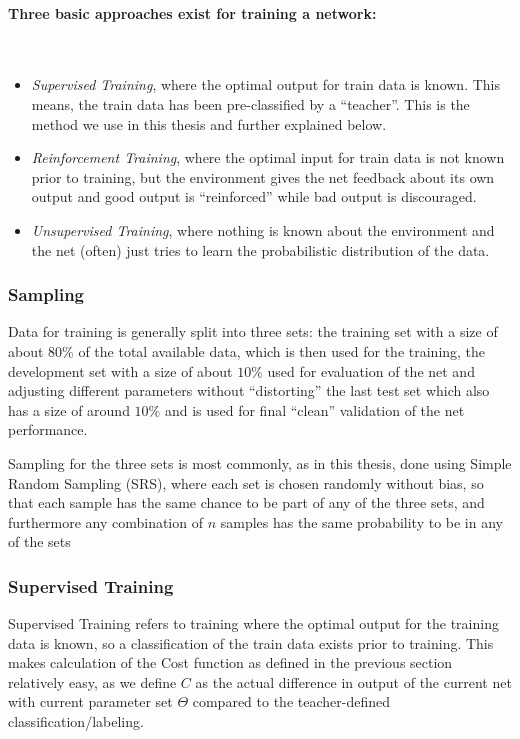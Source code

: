 \paragraph{Three basic approaches exist for training a network:} \hspace{0pt} \\
\begin{itemize}
\item \textit{Supervised Training}, where the optimal output for train data is known. This means, the train data has been pre-classified by a ``teacher''. This is the method we use in this thesis and further explained below.
\item \textit{Reinforcement Training}, where the optimal input for train data is not known prior to training, but the environment gives the net feedback about its own output and good output is ``reinforced'' while bad output is discouraged.
\item \textit{Unsupervised Training}, where nothing is known about the environment and the net (often) just tries to learn the probabilistic distribution of the data.
\end{itemize}

\subsubsection{Sampling}
\label{sec:fund:Sampling}

Data for training is generally split into three sets: the training set with a size of about \(80\%\) of the total available data, which is then used for the training, the development set with a size of about \(10\%\) used for evaluation of the net and adjusting different parameters without ``distorting'' the last test set which also has a size of around \(10\%\) and is used for final ``clean'' validation of the net performance.


Sampling for the three sets is most commonly, as in this thesis, done using Simple Random Sampling (SRS), where each set is chosen randomly without bias, so that each sample has the same chance to be part of any of the three sets, and furthermore any combination of \(n\) samples has the same probability to be in any of the sets~\cite{meng2013scalable}

\subsubsection{Supervised Training}
\label{sec:fund:ST}
Supervised Training refers to training where the optimal output for the training data is known, so a classification of the train data exists prior to training. This makes calculation of the Cost function as defined in the previous section relatively easy, as we define \(C\) as the actual difference in output of the current net with current parameter set \(\Theta\) compared to the teacher-defined classification/labeling. 

